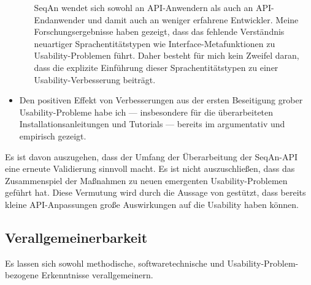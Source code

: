 \begin{itemize}
\begin{enumerate}
\begin{itemize}
    \end{itemize}
    SeqAn wendet sich sowohl an API-Anwendern als auch an API-Endanwender und damit auch an weniger erfahrene Entwickler. Meine Forschungsergebnisse haben gezeigt, dass das fehlende Verständnis neuartiger Sprachentitätstypen wie Interface-Metafunktionen zu Usability-Problemen führt. Daher besteht für mich kein Zweifel daran, dass die explizite Einführung dieser Sprachentitätstypen zu einer Usability-Verbesserung beiträgt.
  \end{enumerate}
  \item Den positiven Effekt von Verbesserungen aus der ersten Beseitigung grober Usability-Probleme habe ich --- insbesondere für die überarbeiteten Installationsanleitungen und Tutorials --- bereits im  argumentativ und empirisch gezeigt.
\end{itemize}

\bigskip

Es ist davon auszugehen, dass der Umfang der Überarbeitung der SeqAn-API eine erneute Validierung sinnvoll macht. Es ist nicht auszuschließen, dass das Zusammenspiel der Maßnahmen zu neuen emergenten Usability-Problemen geführt hat. Diese Vermutung wird durch die Aussage von \cite{Stylos:2009ts} gestützt, dass bereits kleine API-Anpassungen große Auswirkungen auf die Usability haben können.





\subsection{Verallgemeinerbarkeit}

Es lassen sich sowohl methodische, softwaretechnische und Usability-Problem-bezogene Erkenntnisse verallgemeinern.


